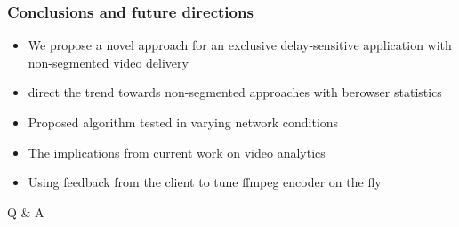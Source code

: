 \documentclass[mathserif]{beamer}
\begin{document}
	\begin{frame}
		\frametitle{Conclusions and future directions}
		\begin{itemize}
			\item We propose a novel approach for an exclusive delay-sensitive application with non-segmented video delivery \pause
			\item direct the trend towards non-segmented approaches with berowser statistics \pause
			\item Proposed algorithm tested in varying network conditions  \pause
			\item The implications from current work on video analytics \pause
			\item Using feedback from the client to tune ffmpeg encoder on the fly
			
		\end{itemize}
		
		
	\end{frame}
	
	\begin{frame}{Q \& A}
		
		
		\hspace{70pt}{\huge               Thank you!}
	\end{frame}
	
\end{document}
